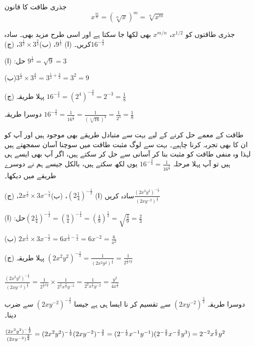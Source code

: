 جذری طاقت کا قانون 
\[x^{\frac{m}{n}}=(\sqrt[n]{x})^{m}=\sqrt[n]{x^{m}}\]

جذری طاقتوں کو \(x^{1/2}\)، \(x^{m/n}\) بھی لکھا جا سکتا ہے اور اسی طرح مزید بھی۔
سادہ کریں۔ (ا) \(9^{\frac{1}{2}}\)، (ب)\(3^{\frac{1}{2}}\times 3^{\frac{3}{2}}\)، (ج)\(16^{-\frac{3}{4}}\)

حل:
(ا)
\(9^{\frac{1}{2}}=\sqrt{9}=3\)

(ب)\(3^{\frac{1}{2}}\times 3^{\frac{3}{2}}=3^{\frac{1}{2}+\frac{3}{2}}=3^{2}=9\)

(ج) پہلا طریقہ \(16^{-\frac{3}{4}}=(2^{4})^{-\frac{3}{4}}=2^{-3}=\frac{1}{8}\)

دوسرا طریقہ 
\(16^{-\frac{3}{4}}=\frac{1}{16^{\frac{3}{4}}}=\frac{1}{(\sqrt[4]{16})^{3}}=\frac{1}{2^{3}}=\frac{1}{8}\)

طاقت کے معمے حل کرنے کے لیے بہت سے متبادل طریقے بھی موجود ہیں اور آپ کو ان کا بھی تجربہ کرنا چاہیے۔ بہت سے لوگ مثبت طاقت میں سوچنا آسان سمجھتے ہیں لہذا وہ منفی طاقت کو مثبت بنا کر آسانی سے حل کر سکتے ہیں، اگر آپ بھی ایسے ہی ہیں تو آپ پہلا مرحلہ  \(16^{-\frac{3}{4}}=\frac{1}{16^{\frac{3}{4}}}\) یوں لکھ سکتے ہیں، بالکل جیسے ہم نے دوسرے طریقے میں دیکھا۔

سادہ کریں
(ا) \((2\frac{1}{4})^{-\frac{1}{2}}\)، (ب)\(2x^{\frac{1}{2}}\times 3x^{-\frac{5}{2}}\)، (ج)\(\frac{(2x^{2}y^{2})^{-\frac{1}{2}}}{(2xy^{-2})^{\frac{3}{2}}}\)

حل:
(ا)\((2\frac{1}{4})^{-\frac{1}{2}}=(\frac{9}{4})^{-\frac{1}{4}}=(\frac{4}{9})^{\frac{1}{2}}=\sqrt{\frac{4}{9}}=\frac{2}{3}\)

(ب)
\(2x^{\frac{1}{2}}\times 3x^{-\frac{5}{2}}=6x^{\frac{1}{2}-\frac{5}{2}}=6x^{-2}=\frac{6}{x^{2}}\)

(ج)  پہلا طریقہ
\((2x^{2}y^{2})^{-\frac{1}{2}}=\frac{1}{(2x^{2}y^{2})^{\frac{1}{2}}}=\frac{1}{2^{\frac{1}{2}xy}}\)

\(\frac{(2x^{2}y^{2})^{-\frac{1}{2}}}{(2xy^{-2})^{\frac{3}{2}}}=\frac{1}{2^{\frac{1}{2}xy}}\times \frac{1}{2^{\frac{3}{2}}x^{\frac{3}{2}}y^{-3}}= \frac{1}{2^{2}x^{\frac{5}{2}}y^{-2}}=\frac{y^{2}}{4x^{\frac{5}{2}}}\)

دوسرا طریقہ \((2xy^{-2})^{\frac{3}{2}}\) سے تقسیم کر نا ایسا ہی ہے جیسا \((2xy^{-2})^{-\frac{3}{2}}\) سے ضرب دینا۔

\(\frac{(2x^{2}y^{2})^{-\frac{1}{2}}}{(2xy^{-2})^{\frac{3}{2}}}=(2x^{2}y^{2})^{-\frac{1}{2}}(2xy^{-2})^{-\frac{3}{2}}=(2^{-\frac{1}{2}}x^{-1}y^{-1})(2^{-\frac{3}{2}}x^{-\frac{3}{2}}y^{3})=2^{-2}x^{\-\frac{5}{2}}y^{2}\)

